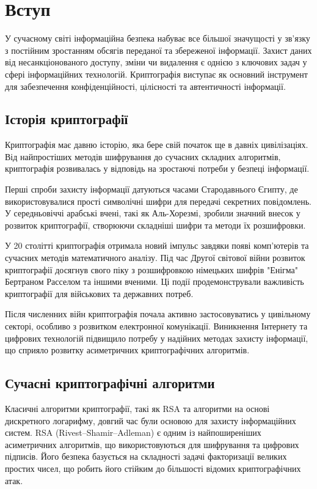\documentclass[12pt]{report}
\theoremstyle{definition}
\theoremstyle{plain}
\begin{document}
\tableofcontents

\chapter*{Вступ}

У сучасному світі інформаційна безпека набуває все більшої значущості у зв’язку з постійним зростанням обсягів переданої та збереженої інформації. Захист даних від несанкціонованого доступу, зміни чи видалення є однією з ключових задач у сфері інформаційних технологій. Криптографія виступає як основний інструмент для забезпечення конфіденційності, цілісності та автентичності інформації.

\section{Історія криптографії}

Криптографія має давню історію, яка бере свій початок ще в давніх цивілізаціях. Від найпростіших методів шифрування до сучасних складних алгоритмів, криптографія розвивалась у відповідь на зростаючі потреби у безпеці інформації.

Перші спроби захисту інформації датуються часами Стародавнього Єгипту, де використовувалися прості символічні шифри для передачі секретних повідомлень. У середньовіччі арабські вчені, такі як Аль-Хорезмі, зробили значний внесок у розвиток криптографії, створюючи складніші шифри та методи їх розшифровки.

У 20 столітті криптографія отримала новий імпульс завдяки появі комп'ютерів та сучасних методів математичного аналізу. Під час Другої світової війни розвиток криптографії досягнув свого піку з розшифровкою німецьких шифрів "Енігма" Бертраном Расселом та іншими вченими. Ці події продемонстрували важливість криптографії для військових та державних потреб.

Після численних війн криптографія почала активно застосовуватись у цивільному секторі, особливо з розвитком електронної комунікації. Виникнення Інтернету та цифрових технологій підвищило потребу у надійних методах захисту інформації, що сприяло розвитку асиметричних криптографічних алгоритмів.

\section{Сучасні криптографічні алгоритми}

Класичні алгоритми криптографії, такі як RSA та алгоритми на основі дискретного логарифму, довгий час були основою для захисту інформаційних систем. RSA (Rivest–Shamir–Adleman) є одним із найпоширеніших асиметричних алгоритмів, що використовуються для шифрування та цифрових підписів. Його безпека базується на складності задачі факторизації великих простих чисел, що робить його стійким до більшості відомих криптографічних атак.
\end{document}
